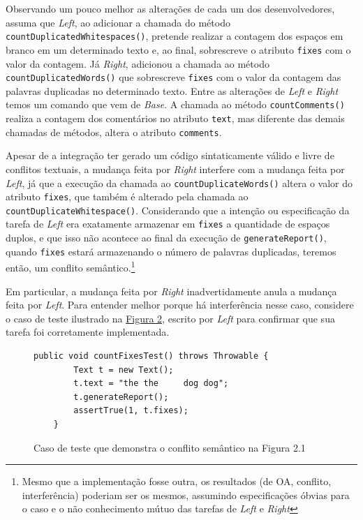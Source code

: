Observando um pouco melhor as alterações de cada um dos desenvolvedores, assuma que \emph{Left}, ao adicionar a chamada do método \texttt{countDuplicatedWhitespaces()}, pretende realizar a contagem dos espaços em branco em um determinado texto e, ao final, sobrescreve o atributo \texttt{fixes} com o valor da contagem. Já \emph{Right}, adicionou a chamada ao método \texttt{countDuplicatedWords()} que sobrescreve \texttt{fixes} com o valor da contagem das palavras duplicadas no determinado texto. Entre as alterações de \emph{Left} e \emph{Right} temos um comando que vem de \emph{Base}. A chamada ao método \texttt{countComments()} realiza a contagem dos comentários no atributo \texttt{text}, mas diferente das demais chamadas de métodos, altera o atributo \texttt{comments}.

Apesar de a integração ter gerado um código sintaticamente válido e livre de conflitos textuais, a mudança feita por \emph{Right} interfere com a mudança feita por \emph{Left}, já que a execução da chamada ao \texttt{countDuplicateWords()} altera o valor do atributo \texttt{fixes}, que também é alterado pela chamada ao \texttt{countDuplicateWhitespace()}. Considerando que a intenção ou especificação da tarefa de \emph{Left} era exatamente armazenar em \texttt{fixes} a quantidade de espaços duplos, e que isso não acontece ao final da execução de \texttt{generateReport()}, quando \texttt{fixes} estará armazenando o número de palavras duplicadas, teremos então, um conflito semântico.\footnote{Mesmo que a implementação fosse outra, os resultados (de OA, conflito, interferência) poderiam ser os mesmos, assumindo especificações óbvias para o caso e o não conhecimento mútuo das tarefas de \emph{Left} e \emph{Right}} 

Em particular, a mudança feita por \emph{Right} inadvertidamente anula a mudança feita por \emph{Left}.
Para entender melhor porque há interferência nesse caso, considere o caso de teste ilustrado na \hyperref[fig:teste-motivador]{Figura 2}, escrito por \emph{Left} para confirmar que sua tarefa foi corretamente implementada.

\begin{figure}[h]
    \begin{lstlisting}[]
    public void countFixesTest() throws Throwable {
        Text t = new Text();
        t.text = "the the     dog dog";
        t.generateReport();
        assertTrue(1, t.fixes);
    }
    \end{lstlisting}
    \caption{Caso de teste que demonstra o conflito semântico na Figura 2.1}
    \label{fig:teste-motivador}
\end{figure}

